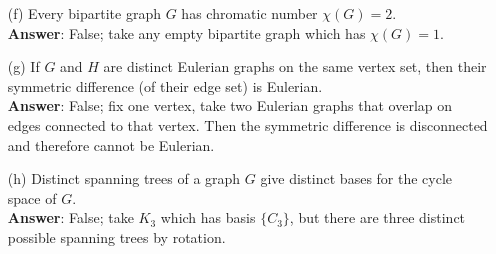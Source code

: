 \documentclass{article}
\begin{document}
\begin{itemize}
\begin{itemize}
                  \item [(f)] Every bipartite graph $G$ has chromatic number $\chi(G)=2$.\\
                        \textbf{Answer}: False; take any empty bipartite graph which has $\chi(G)=1$.
                  \item [(g)] If $G$ and $H$ are distinct Eulerian graphs on the same vertex set, then their symmetric difference (of their edge set) is Eulerian.\\
                        \textbf{Answer}: False; fix one vertex, take two Eulerian graphs that overlap on edges connected to that vertex. Then the symmetric difference is disconnected and therefore cannot be Eulerian.
                  \item [(h)] Distinct spanning trees of a graph $G$ give distinct bases for the cycle space of $G$.\\
                        \textbf{Answer}: False; take $K_3$ which has basis $\{C_3\}$, but there are three distinct possible spanning trees by rotation.
            \end{itemize}
\end{itemize}
\end{document}
